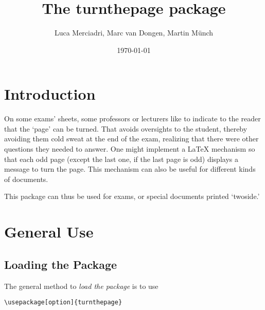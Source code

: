 \documentclass[10pt,a4paper,final,makeidx,twosides]{article}
\title{The \textbf{turnthepage} package}
\author{Luca Merciadri, Marc van Dongen, Martin M\"unch}
\date{\today}
\begin{document}
\maketitle

\tableofcontents

\newpage
\section{Introduction}
On some exams' sheets, some professors or lecturers like to indicate to the reader that the `page' can be turned. That avoids oversights to the student, thereby avoiding them cold sweat at the end of the exam, realizing that there were other questions they needed to answer. One might implement a \LaTeX{} mechanism so that each odd page (except the last one, if the last page is odd) displays a message to turn the page. This mechanism can also be useful for different kinds of documents.

This package can thus be used for exams, or special documents printed `twoside.'

\section{General Use}
\subsection{Loading the Package}
The general method to \textit{load the package} is to use
\begin{center}
\begin{verbatim}
\usepackage[option]{turnthepage}
\end{verbatim}
\end{center}
\end{document}
